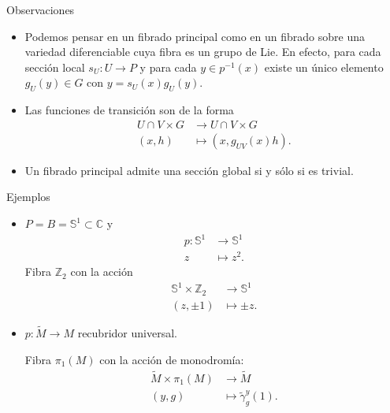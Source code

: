 \documentclass[mathserif]{beamer}
\newcommand{\SF}{\mathbb{S}}
\newcommand{\CC}{\mathbb{C}}
\newcommand{\ZZ}{\mathbb{Z}}
\begin{document}
\begin{frame}{Observaciones}
  \begin{itemize}
    \item Podemos pensar en un fibrado principal como en un fibrado sobre una variedad diferenciable cuya fibra es un grupo de Lie. \pause
      En efecto, para cada sección local $s_U:U\rightarrow P$ y para cada $y\in p^{-1}(x)$ existe un único elemento $g_U(y)\in G$ con $y=s_U(x)g_U(y)$. \pause
    \item Las funciones de transición son de la forma
      \begin{align*}
	 U\cap V \times G&\longrightarrow U\cap V\times G\\ 
	 (x,h) &\longmapsto (x,g_{UV}(x)h). 
	\end{align*}
	\pause
      \item Un fibrado principal admite una sección global si y sólo si es trivial.
  \end{itemize}
\end{frame}

\begin{frame}{Ejemplos}
  \begin{itemize}
    \item $P=B=\SF^1\subset \CC$ y 
      \begin{align*}
	p :\SF^1&\longrightarrow \SF^1\\ 
	  z &\longmapsto z^2.
	\end{align*}
	\pause
	Fibra $\ZZ_2$ con la acción
	\begin{align*}
	   \SF^1\times \ZZ_2&\longrightarrow \SF^1\\ 
	    (z,\pm 1) &\longmapsto \pm z. 
	  \end{align*}
	  \pause
	\item $p:\tilde{M}\rightarrow M$ recubridor universal. \pause
	  
	 Fibra $\pi_1(M)$ con la acción de monodromía: 
	\begin{align*}
	  \tilde{M}\times \pi_1(M)&\longrightarrow \tilde{M}\\ 
	  (y,g) &\longmapsto \tilde{\gamma}_g^y(1).
	  \end{align*}
  \end{itemize}
\end{frame}
\end{document}
